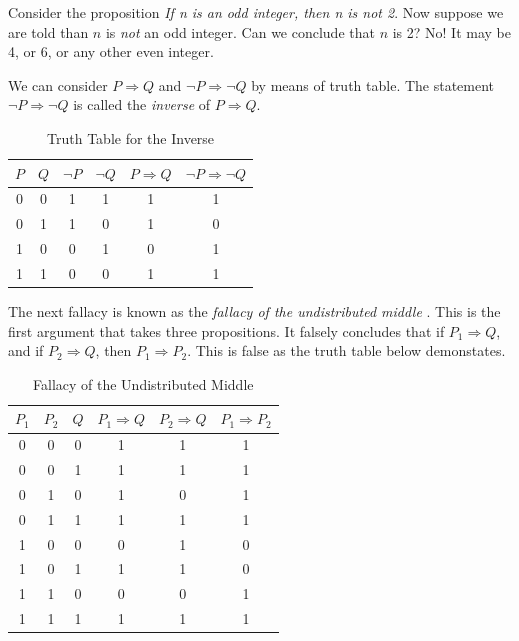         \begin{example}
            Consider the proposition
            \textit{If n is an odd integer, then n is not 2}. Now suppose we are
            told than $n$ is \textit{not} an odd integer. Can we conclude that
            $n$ is 2? No! It may be 4, or 6, or any other even integer.
        \end{example}
        We can consider $P\Rightarrow{Q}$ and $\neg{P}\Rightarrow\neg{Q}$ by
        means of truth table. The statement $\neg{P}\Rightarrow\neg{Q}$ is
        called the \textit{inverse} of $P\Rightarrow{Q}$.
        \begin{table}[H]
            \centering
            \captionsetup{type=table}
            \begin{tabular}{c|c|c|c|c|c}
                $P$&$Q$&$\neg{P}$&$\neg{Q}$&$P\Rightarrow{Q}$
                                           &$\neg{P}\Rightarrow\neg{Q}$\\
                \hline
                0&0&1&1&1&1\\
                0&1&1&0&1&0\\
                1&0&0&1&0&1\\
                1&1&0&0&1&1
            \end{tabular}
            \caption{Truth Table for the Inverse}
            \label{tab:Truth_Table_Inverse}
        \end{table}
        The next fallacy is known as the
        \textit{fallacy of the undistributed middle}%
        . This is the first
        argument that takes three propositions. It falsely concludes that
        if $P_{1}\Rightarrow{Q}$, and if $P_{2}\Rightarrow{Q}$, then
        $P_{1}\Rightarrow{P}_{2}$. This is false as the truth table below
        demonstates.
        \begin{table}[H]
            \centering
            \captionsetup{type=table}
            \begin{tabular}{c|c|c|c|c|c}
                $P_{1}$&$P_{2}$&$Q$&$P_{1}\Rightarrow{Q}$&$P_{2}\Rightarrow{Q}$
                                   &$P_{1}\Rightarrow{P}_{2}$\\
                \hline
                0&0&0&1&1&1\\
                0&0&1&1&1&1\\
                0&1&0&1&0&1\\
                0&1&1&1&1&1\\
                1&0&0&0&1&0\\
                1&0&1&1&1&0\\
                1&1&0&0&0&1\\
                1&1&1&1&1&1
            \end{tabular}
            \caption{Fallacy of the Undistributed Middle}
            \label{tab:Fallcy_of_Undistributed_Middle}
        \end{table}

